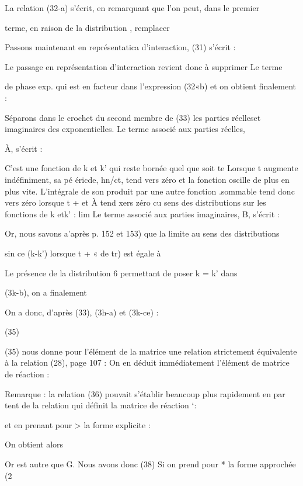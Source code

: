 La relation (32-a) s'écrit, en remarquant que l'on peut, dans le premier

terme, en raison de la distribution , remplacer


Passons maintenant en représentatica d'interaction, (31) s'écrit :

Le passage en représentation d'interaction revient donc à supprimer Le terme

de phase exp. qui est en facteur dans l'expression (32«b)
et on obtient finalement :



Séparons dans le crochet du second membre de (33) les parties
réelleset imaginaires des exponentielles. Le terme associé aux parties réelles,

À, s'écrit :


C'est une fonction de k et k' qui reste bornée quel que soit te
Lorsque t augmente indéfiniment, sa pé éricde, hn/ct, tend vers zéro et la fonction oscille de plus en plus vite. L'intégrale de son produit par une autre
fonction .sommable tend donc vers zéro lorsque t + et À tend xers zéro cu
sens des distributions sur les fonctions de k etk' :
 lim
Le terme associé aux parties imaginaires, B, s'écrit :

Or, nous savons a'après p. 152 et 153) que la limite au sens des distributions

sin ce (k-k') 
lorsque t + « de tr) est égale à 

Le présence de la distribution 6 permettant de poser k = k' dans

(3k-b), on a finalement


On a donc, d'après (33), (3h-a) et (3k-ce) :



(35) 

(35) nous donne pour l'élément de la matrice  une relation strictement
équivalente à la relation (28), page 107 :
On en déduit immédiatement l'élément de matrice de réaction :


Remarque : la relation (36) pouvait s'établir beaucoup plus rapidement en par
tent de la relation qui définit la matrice de réaction ‘:

et en prenant pour > la forme explicite :

On obtient alors

Or  est autre que G. Nous avons donc
(38)
Si on prend pour * la forme approchée (2%

